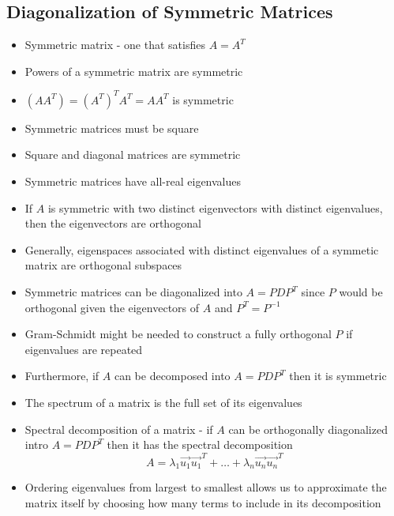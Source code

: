 \documentclass{article}
\begin{document}
\subsection{Diagonalization of Symmetric Matrices}
\begin{itemize}
    \item Symmetric matrix - one that satisfies \(A=A^T\)
    \item Powers of a symmetric matrix are symmetric 
    \item \((AA^T)=(A^T)^TA^T=AA^T\) is symmetric
    \item Symmetric matrices must be square 
    \item Square and diagonal matrices are symmetric 
    \item Symmetric matrices have all-real eigenvalues 
    \item If \(A\) is symmetric with two distinct eigenvectors with distinct eigenvalues, then the eigenvectors are orthogonal
    \item Generally, eigenspaces associated with distinct eigenvalues of a symmetic matrix are orthogonal subspaces  
    \item Symmetric matrices can be diagonalized into \(A=PDP^T\) since \(P\) would be orthogonal given the eigenvectors of \(A\) and \(P^T=P^{-1}\)
    \item Gram-Schmidt might be needed to construct a fully orthogonal \(P\) if eigenvalues are repeated 
    \item Furthermore, if \(A\) can be decomposed into \(A=PDP^T\) then it is symmetric 
    \item The spectrum of a matrix is the full set of its eigenvalues 
    \item Spectral decomposition of a matrix - if \(A\) can be orthogonally diagonalized intro \(A=PDP^T\) then it has the spectral decomposition 
    \[A=\lambda_1\vec{u_1}\vec{u_1}^T+\dots+\lambda_n\vec{u_n}\vec{u_n}^T\]
    \item Ordering eigenvalues from largest to smallest allows us to approximate the matrix itself by choosing how many terms to include in its decomposition
\end{itemize}
\end{document}
